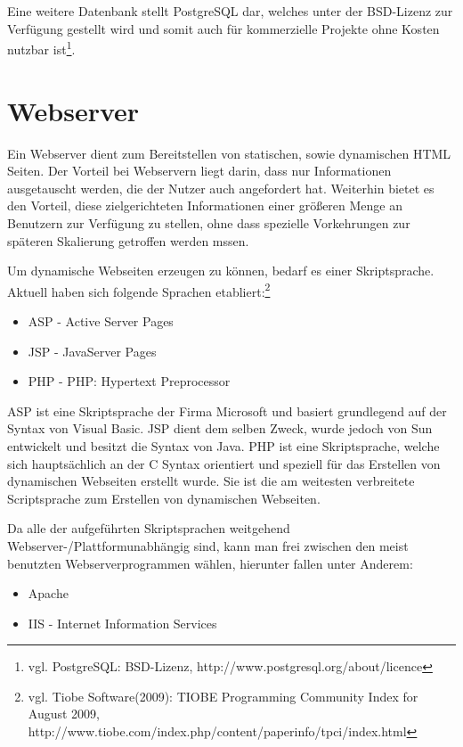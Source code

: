 Eine weitere Datenbank stellt PostgreSQL dar, welches unter der BSD-Lizenz zur Verfügung gestellt wird und somit auch für kommerzielle Projekte ohne Kosten nutzbar ist\footnote{vgl. PostgreSQL: BSD-Lizenz, http://www.postgresql.org/about/licence}.


\section{Webserver}
\label{sec:websrv}

Ein Webserver dient zum Bereitstellen von statischen, sowie dynamischen HTML Seiten.
Der Vorteil bei Webservern liegt darin, dass nur Informationen ausgetauscht werden, die der Nutzer auch angefordert hat.
Weiterhin bietet es den Vorteil, diese zielgerichteten Informationen einer größeren Menge an Benutzern zur Verfügung zu stellen, ohne dass spezielle Vorkehrungen zur späteren Skalierung getroffen werden mssen.

Um dynamische Webseiten erzeugen zu können, bedarf es einer Skriptsprache.
Aktuell haben sich folgende Sprachen etabliert:\footnote{vgl. Tiobe Software(2009): TIOBE Programming Community Index for August 2009, http://www.tiobe.com/index.php/content/paperinfo/tpci/index.html}

\begin{itemize}
\item ASP - Active Server Pages
\item JSP - JavaServer Pages
\item PHP - PHP: Hypertext Preprocessor
\end{itemize}

ASP ist eine Skriptsprache der Firma Microsoft und basiert grundlegend auf der Syntax von Visual Basic.
JSP dient dem selben Zweck, wurde jedoch von Sun entwickelt und besitzt die Syntax von Java.
PHP ist eine Skriptsprache, welche sich hauptsächlich an der C Syntax orientiert und speziell für das Erstellen von
dynamischen Webseiten erstellt wurde. Sie ist die am weitesten verbreitete Scriptsprache zum Erstellen von dynamischen Webseiten.

Da alle der aufgeführten Skriptsprachen weitgehend Webserver-/Plattformunabhängig sind, kann man frei zwischen den meist benutzten Webserverprogrammen wählen, hierunter fallen unter Anderem:


\begin{itemize}
\item Apache
\item IIS - Internet Information Services
\end{itemize}

